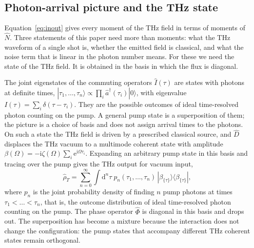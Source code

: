 \documentclass[aps,pra,reprint,superscriptaddress,amsmath,amssymb,floatfix]{revtex4-2}
\newcommand{\Nop}{\hat N}
\newcommand{\Iop}{\hat I}
\newcommand{\dd}{\mathrm{d}}
\newcommand{\ee}{\mathrm{e}}
\newcommand{\ii}{\mathrm{i}}
\begin{document}
\subsection{Photon-arrival picture and the THz state}

Equation~\eqref{eq:inout} gives every moment of the THz field in terms of
moments of $\Nop$. Three statements of this paper need more than moments:
what the THz waveform of a single shot is, whether the emitted field is
classical, and what the noise term that is linear in the photon number
means. For these we need the state of the THz field. It is obtained in the
basis in which the flux is diagonal.

The joint eigenstates of the commuting operators $\Iop(\tau)$ are states with
photons at definite times, $|\tau_1,\dots,\tau_n\rangle\propto\prod_i\hat
a^\dagger(\tau_i)|0\rangle$, with eigenvalue $I(\tau)=\sum_i\delta(\tau-\tau_i)$.
They are the possible outcomes of ideal time-resolved photon counting on the
pump. A general pump state is a superposition of them; the picture is a
choice of basis and does not assign arrival times to the photons.
On such a state the THz field is driven by a prescribed classical source, and
$\hat D$ displaces the THz vacuum to a multimode coherent state
\cite{glauber1963} with amplitude $\beta(\Omega)=-\ii\zeta(\Omega)\sum_i\ee^{\ii\Omega\tau_i}$.
Expanding an arbitrary pump state in this basis and tracing over the pump
gives the THz output for vacuum input,
\begin{equation}
\hat\rho_T=\sum_{n=0}^\infty\int\!\dd^n\tau\;p_n(\tau_1,\dots,\tau_n)\,
|\beta_{\{\tau\}}\rangle\langle\beta_{\{\tau\}}|,
\label{eq:rhoT}
\end{equation}
where $p_n$ is the joint probability density of finding $n$ pump photons at
times $\tau_1<\dots<\tau_n$, that is, the outcome distribution of ideal
time-resolved photon counting on the pump. The phase operator $\hat\Phi$ is
diagonal in this basis and drops out. The superposition has become a mixture
because the interaction does not change the configuration: the pump states
that accompany different THz coherent states remain orthogonal.
\end{document}
